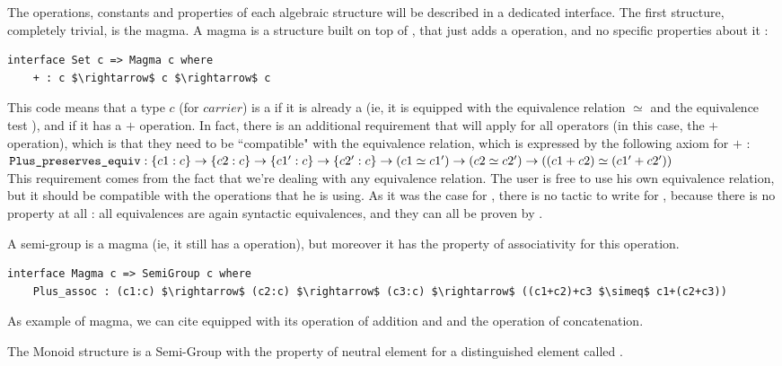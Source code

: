 The operations, constants and properties of each algebraic structure will be described in a dedicated interface. The first structure, completely trivial, is the magma. A magma is a structure built on top of , that just adds a  operation, and no specific properties about it :

\begin{lstlisting}
interface Set c => Magma c where
    + : c $\rightarrow$ c $\rightarrow$ c
\end{lstlisting}

This code means that a type $c$ (for $carrier$) is a  if it is already a  (ie, it is equipped with the equivalence relation $\simeq$ and the equivalence test ), and if it has a $+$ operation.
In fact, there is an additional requirement that will apply for all operators (in this case, the $+$ operation), which is that they need to be ``compatible" with the equivalence relation, which is expressed by the following axiom for $+$ : \\ ${\mbox{\texttt{Plus\_preserves\_equiv}}} : \{c1:c\} \rightarrow \{c2:c\} \rightarrow \{c1':c\} \rightarrow \{c2':c\} \rightarrow (c1 \simeq c1') \rightarrow (c2 \simeq c2') \rightarrow ((c1+c2) \simeq (c1'+c2'))$ \\ 
This requirement comes from the fact that we're dealing with any equivalence relation. The user is free to use his own equivalence relation, but it should be compatible with the operations that he is using.
As it was the case for , there is no tactic to write for , because there is no property at all : all equivalences are again syntactic equivalences, and they can all be proven by . 

A semi-group is a magma (ie, it still has a  operation), but moreover it has the property of associativity for this operation. 

\begin{lstlisting}
interface Magma c => SemiGroup c where
    Plus_assoc : (c1:c) $\rightarrow$ (c2:c) $\rightarrow$ (c3:c) $\rightarrow$ ((c1+c2)+c3 $\simeq$ c1+(c2+c3))
\end{lstlisting}

As example of magma, we can cite  equipped with its operation of addition and  and the operation of concatenation.

The Monoid structure is a Semi-Group with the property of neutral element for a distinguished element called .

